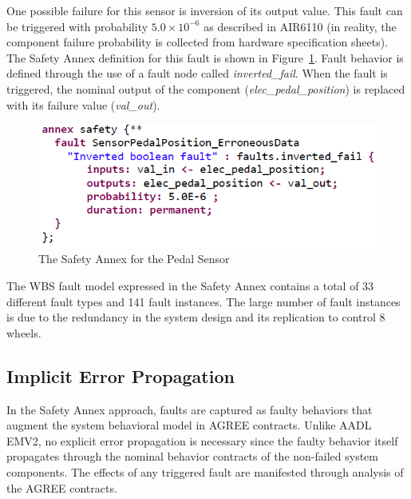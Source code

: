 One possible failure for this sensor is inversion of its output value. This fault can be triggered with probability $5.0\times 10^{-6}$ as described in AIR6110 (in reality, the component failure probability is 
collected from hardware specification sheets).  
The Safety Annex definition for this fault is shown in Figure~\ref{fig:sensorFault}. Fault behavior is defined through the use of a fault node called \textit{inverted\_fail}.  When the fault is triggered, the nominal output of the component (\textit{elec\_pedal\_position}) is replaced with its failure value (\textit{val\_out}). 

\begin{figure}[h!]
	\begin{center}
		\includegraphics[width=.9\columnwidth]{images/safetyannex_sensorfault.png}
		\caption{The Safety Annex for the Pedal Sensor}
		\label{fig:sensorFault}
	\end{center}
	\vspace{-0.1in}
\end{figure}

The WBS fault model expressed in the Safety Annex contains a total of 33 different fault types and 141 fault instances. The large number of fault instances is due to the redundancy in the system design and its replication to control 8 wheels.

\subsection{Implicit Error Propagation}
In the Safety Annex approach, faults are captured as faulty behaviors that augment the system behavioral model in AGREE contracts. Unlike AADL EMV2, no explicit %
error propagation is necessary since the faulty behavior itself propagates through the nominal behavior contracts of the non-failed system components. The effects of any triggered fault are manifested through analysis of the AGREE contracts.  

